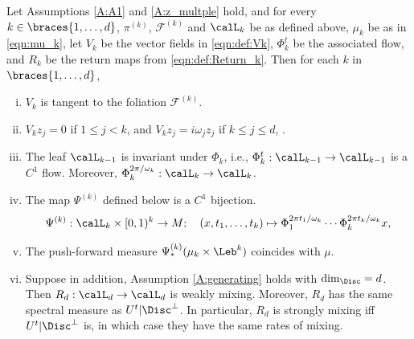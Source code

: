 \documentclass[12pt,oneside]{article}
\newcommand{\Fol}{\mathcal{F}}
\newcommand{\Return}{R}
\newcommand{\Iso}{\Psi}
\begin{document}
\begin{theorem}  \label{thm:Main}
Let Assumptions \ref{A:A1} and \ref{A:z_multple} hold, and for every $k\in \braces{ 1, \ldots, d}$, $\pi^{(k)}$, $\Fol^{(k)}$ and $\calL_k$ be as defined above, $\mu_k$ be as in \eqref{eqn:mu_k},  let $V_k$ be the vector fields in \eqref{eqn:def:Vk}, $\Phi_k^t$ be the associated flow, and $\Return_k$ be the return maps from \eqref{eqn:def:Return_k}. Then for each $k$ in $\braces{1, \ldots, d}$,
%
\begin{enumerate}[(i)]
    \item $V_k$ is tangent to the foliation $\Fol^{(k)}$.
    \item $V_k z_j = 0$ if $1\leq j<k$,  and $V_k z_j = i \omega_j z_j$ if $k\leq j\leq d$, .
	\item The leaf $\calL_{k-1}$ is invariant under $\Phi_k$, i.e.,  $\Phi_k^t:\calL_{k-1} \to \calL_{k-1}$ is a $C^1$ flow. Moreover, $\Phi_k^{2\pi/\omega_k}:\calL_{k} \to \calL_{k}$.
	\item The map $\Iso^{(k)}$ defined below is a $C^1$ bijection.
	\begin{equation} \label{eqn:Td_translate}
		\Iso^{(k)}:\calL_k\times [0,1)^k \to M; \quad (x,t_1,\ldots,t_k) \mapsto \Phi_{1}^{2\pi t_1/ \omega_k} \cdots \Phi_{k}^{2\pi t_k/ \omega_k} x,
	\end{equation}
	\item The push-forward measure $\Iso^{(k)}_*(\mu_k \times \Leb^k)$ coincides with $\mu$.
	\item Suppose in addition, Assumption \ref{A:generating} holds with $\dim_{\Disc} = d$. Then $\Return_d: \calL_d \to \calL_d$ is weakly mixing. Moreover, $\Return_d$ has the same spectral measure as $U^t | \Disc^\bot$. In particular, $\Return_d$ is strongly mixing iff $U^t | \Disc^\bot$ is, in which case they have the same rates of mixing.
\end{enumerate}
\end{theorem}
\end{document}
